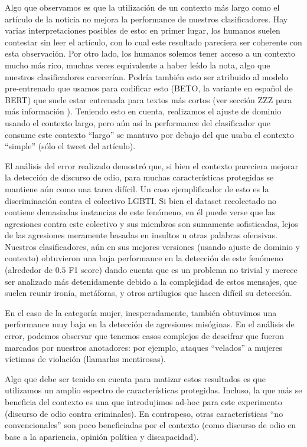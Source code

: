 Algo que observamos es que la utilización de un contexto más largo como el artículo de la noticia no mejora la performance de nuestros clasificadores. Hay varias interpretaciones posibles de esto: en primer lugar, los humanos suelen contestar sin leer el artículo, con lo cual este resultado pareciera ser coherente con esta observación. Por otro lado, los humanos solemos tener acceso a un contexto mucho más rico, muchas veces equivalente a haber leído la nota, algo que nuestros clasificadores carecerían. Podría también esto ser atribuido al modelo pre-entrenado que usamos para codificar esto (BETO, la variante en español de BERT) que suele estar entrenada para textos más cortos (ver sección ZZZ para más información ). Teniendo esto en cuenta, realizamos el ajuste de dominio usando el contexto largo, pero aún así la performance del clasificador que consume este contexto ``largo'' se mantuvo por debajo del que usaba el contexto ``simple'' (sólo el tweet del artículo).

El análisis del error realizado demostró que, si bien el contexto pareciera mejorar la detección de discurso de odio, para muchas características protegidas se mantiene aún como una tarea difícil. Un caso ejemplificador de esto es la discriminación contra el colectivo LGBTI. Si bien el dataset recolectado no contiene demasiadas instancias de este fenómeno, en él puede verse que las agresiones contra este colectivo y sus miembros son sumamente sofisticadas, lejos de las agresiones meramente basadas en insultos u otras palabras ofensivas. Nuestros clasificadores, aún en sus mejores versiones (usando ajuste de dominio y contexto) obtuvieron una baja performance en la detección de este fenómeno (alrededor de $0.5$ F1 score) dando cuenta que es un problema no trivial y merece ser analizado más detenidamente debido a la complejidad de estos mensajes, que suelen reunir ironía, metáforas, y otros artilugios que hacen difícil su detección.

En el caso de la categoría mujer, inesperadamente, también obtuvimos una performance muy baja en la detección de agresiones misóginas. En el análisis de error, podemos observar que tenemos casos complejos de descifrar que fueron marcados por nuestros anotadores: por ejemplo, ataques ``velados'' a mujeres víctimas de violación (llamarlas mentirosas). 

Algo que debe ser tenido en cuenta para matizar estos resultados es que utilizamos un amplio espectro de características protegidas. Incluso, la que más se beneficia del contexto es una que introdujimos ad-hoc para este experimento (discurso de odio contra criminales). En contrapeso, otras características ``no convencionales'' son poco beneficiadas por el contexto (como discurso de odio en base a la apariencia, opinión política y discapacidad).

